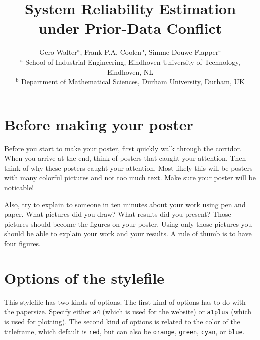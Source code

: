 \documentclass[a0,red]{opacpstr}
\title{System Reliability Estimation\\ under Prior-Data Conflict}
\author{{\large Gero Walter${}^\text{a}$, Frank P.A. Coolen${}^\text{b}$, Simme Douwe Flapper${}^\text{a}$}\\
        {\small ${}^\text{a}$ School of Industrial Engineering, Eindhoven University of Technology, Eindhoven, NL\\
                ${}^\text{b}$ Department of Mathematical Sciences, Durham University, Durham, UK}}
\begin{document}
%

\begin{multicols}{3}
\section{Before making your poster}
Before you start to make your poster, first quickly walk through the corridor.
When you arrive at the end, think of posters that caught your attention. Then
think of why these posters caught your attention. Most likely this will be
posters with many colorful pictures and not too much text. Make sure your
poster will be noticable!

Also, try to explain to someone in ten minutes about your work using pen and
paper. What pictures did you draw? What results did you present? Those pictures
should become the figures on your poster.  Using only those pictures you should
be able to explain your work and your results. A rule of thumb is to have four
figures.


\section{Options of the stylefile}
This stylefile has two kinds of options. The first kind of
options has to do with the papersize. Specify either \texttt{a4} (which is
used for the website) or \texttt{a1plus} (which is used for plotting). The
second kind of options is related to the color of the titleframe, which default
is \texttt{red}, but can also be \texttt{orange}, \texttt{green},
\texttt{cyan}, or \texttt{blue}.


\end{multicols}
\end{document}
